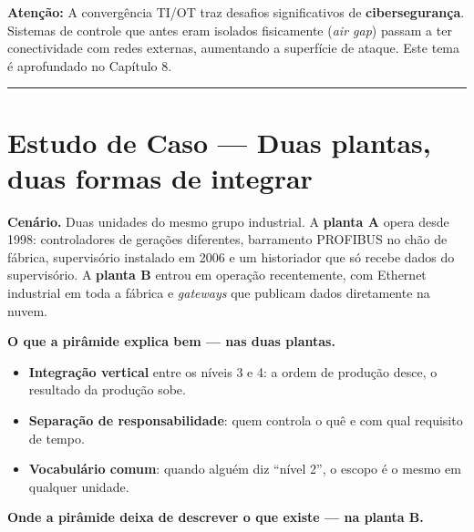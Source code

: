 \begin{caixaatencao}

\textbf{Atenção:} A convergência TI/OT traz desafios significativos de \textbf{cibersegurança}. Sistemas de controle que antes eram isolados fisicamente (\emph{air gap}) passam a ter conectividade com redes externas, aumentando a superfície de ataque. Este tema é aprofundado no Capítulo 8.

\end{caixaatencao}

\begin{center}\rule{0.5\linewidth}{0.5pt}\end{center}

\section{\texorpdfstring{Estudo de Caso --- Duas plantas, duas formas de integrar}{Estudo de Caso  Duas plantas, duas formas de integrar}}\label{estudo-de-caso-duas-plantas-duas-formas-de-integrar}

\textbf{Cenário.} Duas unidades do mesmo grupo industrial. A \textbf{planta A} opera desde 1998:
controladores de gerações diferentes, barramento PROFIBUS no chão de fábrica, supervisório
instalado em 2006 e um historiador que só recebe dados do supervisório. A \textbf{planta B} entrou em
operação recentemente, com Ethernet industrial em toda a fábrica e \emph{gateways} que publicam dados
diretamente na nuvem.

\textbf{O que a pirâmide explica bem --- nas duas plantas.}

\begin{itemize}
\tightlist
\item
  \textbf{Integração vertical} entre os níveis 3 e 4: a ordem de produção desce, o resultado da
  produção sobe.
\item
  \textbf{Separação de responsabilidade}: quem controla o quê e com qual requisito de tempo.
\item
  \textbf{Vocabulário comum}: quando alguém diz ``nível 2'', o escopo é o mesmo em qualquer unidade.
\end{itemize}

\textbf{Onde a pirâmide deixa de descrever o que existe --- na planta B.}

